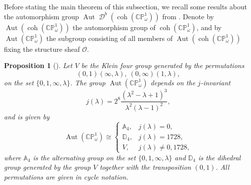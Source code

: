 \documentclass[11pt,a4paper,reqno]{amsart}%
\theoremstyle{plain}
\newtheorem{proposition}[proposition]{Proposition}
\theoremstyle{definition}
\numberwithin{equation}{section}
\numberwithin{equation}{section}
\newcommand{\D}{\operatorname{\mathcal{D}}}
\def\wt{\omega}
\def\coh{\operatorname{coh}}
\def\Aut{\operatorname{Aut}}
\newcommand{\cO}{\mathcal{O}}
\def\coh{\operatorname{coh}}
\def\CPone{\mathbb{CP}^1_{\wt}}
\newcommand\DC[1]{\D^b(\coh(#1))}
\begin{document}
Before stating  the main theorem of this subsection, we recall some results about the  automorphism group  $ \Aut\DC{\CPone}$ from  \cite{LM}.
 Denote by $\Aut(\coh(\CPone))$ the automorphism group of $\coh(\CPone)$, and by
 $\Aut (\CPone)$ the subgroup consisting of all members of $\Aut(\coh(\CPone))$ fixing the structure sheaf $\cO$. 
\begin{proposition}[{\cite[Remark~3.3(iii)]{LM}}]\label{prop:aut-CPone}
 Let  $V$ be  the Klein four group generated by
 the  permutations
 \[
(0,1)(\infty,\lambda),\ 
(0,\infty)(1,\lambda),
\]
on the set   $\{0,1,\infty,\lambda\}$. The group $\Aut (\CPone)$ 
 depends on the  $j$-invariant  
\[
j(\lambda)=2^8\frac{(\lambda^2-\lambda+1)^3}{\lambda^2(\lambda-1)^2},
\]
and is given by
\[
\Aut(\CPone)\cong
\begin{cases}
\mathbb{A}_4,&j(\lambda)=0,\\
\mathbb{D}_4,&j(\lambda)=1728,\\
V,&j(\lambda)\ne0,1728,
\end{cases}
\]
where $\mathbb{A}_4$ is the alternating group on the set $\{0,1,\infty,\lambda\}$ and $\mathbb{D}_4$ is the dihedral group generated by the  group  $V$ together with the transposition $(0,1)$. All permutations are given in cycle notation.
\end{proposition}
\end{document}
